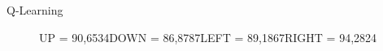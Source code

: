 \documentclass{beamer}
\begin{document}
\begin{frame}{Q-Learning}
	\begin{figure}[hp]
\centering
{}
  \caption*{\newline UP = 90,6534\newline DOWN = 86,8787\newline LEFT = 89,1867\newline RIGHT = 94,2824}\label{fig:fa}
\endminipage\hfill
{}

\end{figure}
\end{frame}
\end{document}
